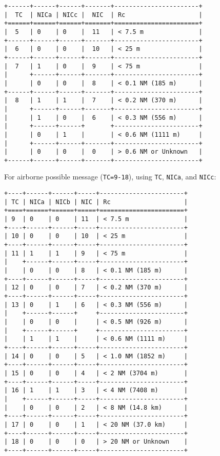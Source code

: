 \begin{verbatim}
+------+------+------+-------+-----------------------+
|  TC  | NICa | NICc |  NIC  | Rc                    |
+======+======+======+=======+=======================+
|  5   | 0    | 0    |  11   | < 7.5 m               |
+------+------+------+-------+-----------------------+
|  6   | 0    | 0    |  10   | < 25 m                |
+------+------+------+-------+-----------------------+
|  7   | 1    | 0    |  9    | < 75 m                |
|      +------+------+-------+-----------------------+
|      | 0    | 0    |  8    | < 0.1 NM (185 m)      |
+------+------+------+-------+-----------------------+
|  8   | 1    | 1    |  7    | < 0.2 NM (370 m)      |
|      +------+------+-------+-----------------------+
|      | 1    | 0    |  6    | < 0.3 NM (556 m)      |
|      +------+------+       +-----------------------+
|      | 0    | 1    |       | < 0.6 NM (1111 m)     |
|      +------+------+-------+-----------------------+
|      | 0    | 0    |  0    | > 0.6 NM or Unknown   |
+------+------+------+-------+-----------------------+
\end{verbatim}

For airborne possible message (\texttt{TC=9-18}), using \texttt{TC},
\texttt{NICa}, and \texttt{NICc}:

\begin{verbatim}
+----+------+------+-----+-----------------------+
| TC | NICa | NICb | NIC | Rc                    |
+====+======+======+=====+=======================+
| 9  | 0    | 0    | 11  | < 7.5 m               |
+----+------+------+-----+-----------------------+
| 10 | 0    | 0    | 10  | < 25 m                |
+----+------+------+-----+-----------------------+
| 11 | 1    | 1    | 9   | < 75 m                |
|    +------+------+-----+-----------------------+
|    | 0    | 0    | 8   | < 0.1 NM (185 m)      |
+----+------+------+-----+-----------------------+
| 12 | 0    | 0    | 7   | < 0.2 NM (370 m)      |
+----+------+------+-----+-----------------------+
| 13 | 0    | 1    | 6   | < 0.3 NM (556 m)      |
|    +------+------+     +-----------------------+
|    | 0    | 0    |     | < 0.5 NM (926 m)      |
|    +------+------+     +-----------------------+
|    | 1    | 1    |     | < 0.6 NM (1111 m)     |
+----+------+------+-----+-----------------------+
| 14 | 0    | 0    | 5   | < 1.0 NM (1852 m)     |
+----+------+------+-----+-----------------------+
| 15 | 0    | 0    | 4   | < 2 NM (3704 m)       |
+----+------+------+-----+-----------------------+
| 16 | 1    | 1    | 3   | < 4 NM (7408 m)       |
|    +------+------+-----+-----------------------+
|    | 0    | 0    | 2   | < 8 NM (14.8 km)      |
+----+------+------+-----+-----------------------+
| 17 | 0    | 0    | 1   | < 20 NM (37.0 km)     |
+----+------+------+-----+-----------------------+
| 18 | 0    | 0    | 0   | > 20 NM or Unknown    |
+----+------+------+-----+-----------------------+
\end{verbatim}

